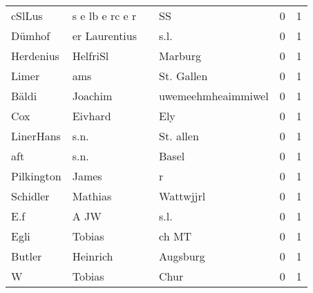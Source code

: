 \begin{center}
\begin{tiny}
\begin{longtabu}{llllrr}
                   cSlLus &                    s e lb e rc e r &             &                                          SS &          0 &         1 \\
                   Dümhof &                      er Laurentius &             &                                        s.l. &          0 &         1 \\
                Herdenius &                           HelfriSl &             &                                     Marburg &          0 &         1 \\
                    Limer &                                ams &             &                                  St. Gallen &          0 &         1 \\
                    Bäldi &                            Joachim &             &                          uwemeehmheaimmiwel &          0 &         1 \\
                      Cox &                            Eivhard &             &                                         Ely &          0 &         1 \\
                LinerHans &                               s.n. &             &                                   St. allen &          0 &         1 \\
                      aft &                               s.n. &             &                                       Basel &          0 &         1 \\
               Pilkington &                              James &             &                                           r &          0 &         1 \\
                 Schidler &                            Mathias &             &                                   Wattwjjrl &          0 &         1 \\
                      E.f &                               A JW &             &                                        s.l. &          0 &         1 \\
                     Egli &                             Tobias &             &                                       ch MT &          0 &         1 \\
                   Butler &                           Heinrich &             &                                    Augsburg &          0 &         1 \\
                        W &                             Tobias &             &                                        Chur &          0 &         1 \\

\end{longtabu}
\end{tiny}
\end{center}
